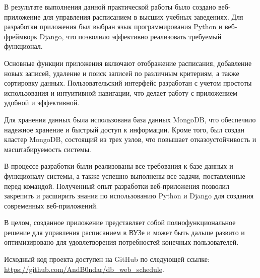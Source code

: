В результате выполнения данной практической работы было создано
веб-приложение для управления расписанием в высших учебных заведениях.
Для разработки приложения был выбран язык программирования Python
и веб-фреймворк Django, что позволило эффективно реализовать
требуемый функционал.\par
Основные функции приложения включают отображение расписания,
добавление новых записей, удаление и поиск записей по различным критериям,
а также сортировку данных. Пользовательский интерфейс разработан
с учетом простоты использования и интуитивной навигации,
что делает работу с приложением удобной и эффективной.\par
Для хранения данных была использована база данных MongoDB,
что обеспечило надежное хранение и быстрый доступ к информации.
Кроме того, был создан кластер MongoDB, состоящий из трех узлов,
что повышает отказоустойчивость и масштабируемость системы.\par
В процессе разработки были реализованы все требования к базе данных
и функционалу системы, а также успешно выполнены все задачи,
поставленные перед командой. Полученный опыт разработки веб-приложения
позволил закрепить и расширить знания по использованию Python и Django
для создания современных веб-приложений.\par
В целом, созданное приложение представляет собой полнофункциональное
решение для управления расписанием в ВУЗе и может быть дальше развито
и оптимизировано для удовлетворения потребностей конечных пользователей.\par
Исходный код проекта доступен на GitHub по следующей ссылке:
\url{https://github.com/AndB0ndar/db_web_schedule}.

